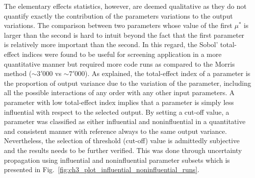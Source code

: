 The elementary effects statistics, however, are deemed qualitative as they do not quantify exactly the contribution of the parameters variations to the output variations.
The comparison between two parameters whose value of the first $\mu^*$ is larger than the second is hard to intuit beyond the fact that the first parameter is relatively more important than the second.
In this regard, the Sobol' total-effect indices were found to be useful for screening application in a more quantitative manner but required more code runs as compared to the Morris method ($\sim 3'000$ vs $\sim 7'000$).
As explained, the total-effect index of a parameter is the proportion of output variance due to the variation of the parameter, including all the possible interactions of any order with any other input parameters.
A parameter with low total-effect index implies that a parameter is simply less influential with respect to the selected output.
By setting a cut-off value, a parameter was classified as either influential and noninfluential in a quantitative and consistent manner with reference always to the same output variance.
Nevertheless, the selection of threshold (cut-off) value is admittedly subjective and the results needs to be further verified.
This was done through uncertainty propagation using influential and noninfluential parameter subsets which is presented in Fig.~\ref{fig:ch3_plot_influential_noninfluential_runs}.

\lipsum[10]
\lipsum[10]
\lipsum[10]
\lipsum[10]
\lipsum[10]
\lipsum[10]
\lipsum[10]